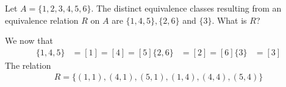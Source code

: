 \documentclass[12pt]{article}
\newenvironment{problem}[2][Problem]{\begin{trivlist}
		\item[\hskip \labelsep {\bfseries #1}\hskip \labelsep {\bfseries #2.}]}{\end{trivlist}}
\newenvironment{solution}[2][Solution]{\begin{trivlist}
		\item[\hskip \labelsep {\bfseries #1}\hskip \labelsep {\bfseries #2.}]}{\end{trivlist}}
\begin{document}
	\begin{problem}{26}
		Let $A=\{1,2,3,4,5,6\}$. The distinct equivalence classes resulting from an equivalence relation $R$ on $A$ are $\{1,4,5\}, \{2,6\}$ and $\{3\}$. What is $R$?
		\begin{solution}{26}
			We now that
			\begin{align*}
				 \{1,4,5\} &= [1] = [4] = [5]
				 \{2,6\} &= [2] = [6]
				 \{3\} &= [3]
			\end{align*}
			The relation
			\begin{align*}
				R=\{(1,1),(4,1),(5,1),(1,4),(4,4),(5,4)\}
			\end{align*}
		\end{solution}
	\end{problem}
\end{document}
